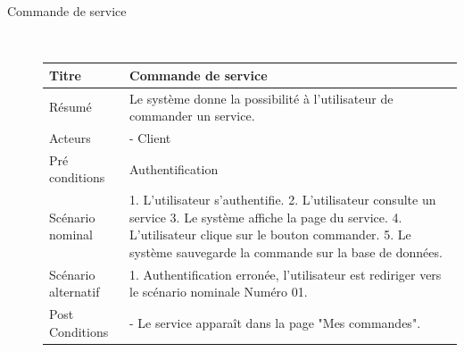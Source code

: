 \documentclass[french]{report}
\begin{document}
\begin{description}
\newpage
        \item[Commande de service] \hfill \\
        \begin{minipage}{\linewidth}
        \centering
            \def\arraystretch{2}
            \begin{tabular}{|m{3cm}|m{9cm}|}
            \hline
            Titre                & Commande de service                                                                                                 \\ 
            \hline
            Résumé               & Le système donne la possibilité à l'utilisateur de commander un service.  \\ 
            \hline
            Acteurs              & - Client                                                                                     \\ 
            \hline
            Pré conditions       & Authentification                                                                                                      \\ 
            \hline
            Scénario nominal     &  
                1. L'utilisateur s'authentifie. 
                2. L'utilisateur consulte un service
                3. Le système affiche la page du service. 
                4. L'utilisateur clique sur le bouton commander. 
                5. Le système sauvegarde la commande sur la base de données. 
                \\ 
            \hline
            Scénario alternatif &   
                1. Authentification erronée, l'utilisateur est rediriger vers le scénario nominale Numéro 01. 
                
            \\ 
            \hline
            Post Conditions & 
                - Le service apparaît dans la page "Mes commandes".  
            \\
            \hline
            \end{tabular}
        \end{minipage}
        

\end{description}
\end{document}
